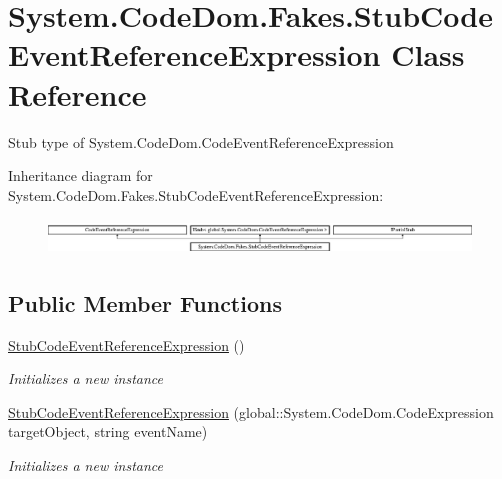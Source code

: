 \hypertarget{class_system_1_1_code_dom_1_1_fakes_1_1_stub_code_event_reference_expression}{\section{System.\-Code\-Dom.\-Fakes.\-Stub\-Code\-Event\-Reference\-Expression Class Reference}
\label{class_system_1_1_code_dom_1_1_fakes_1_1_stub_code_event_reference_expression}
}


Stub type of System.\-Code\-Dom.\-Code\-Event\-Reference\-Expression 


Inheritance diagram for System.\-Code\-Dom.\-Fakes.\-Stub\-Code\-Event\-Reference\-Expression\-:\begin{figure}[H]
\begin{center}
\leavevmode
\includegraphics[height=0.942761cm]{class_system_1_1_code_dom_1_1_fakes_1_1_stub_code_event_reference_expression}
\end{center}
\end{figure}
\subsection*{Public Member Functions}
\begin{DoxyCompactItemize}
\item 
\hyperlink{class_system_1_1_code_dom_1_1_fakes_1_1_stub_code_event_reference_expression_ae121a4548a83c8eb2e98e6e23a9341bb}{Stub\-Code\-Event\-Reference\-Expression} ()
\begin{DoxyCompactList}\small\item\em Initializes a new instance\end{DoxyCompactList}\item 
\hyperlink{class_system_1_1_code_dom_1_1_fakes_1_1_stub_code_event_reference_expression_a1988f9bb3d9c5cc2bd75a7e3820c51f3}{Stub\-Code\-Event\-Reference\-Expression} (global\-::\-System.\-Code\-Dom.\-Code\-Expression target\-Object, string event\-Name)
\begin{DoxyCompactList}\small\item\em Initializes a new instance\end{DoxyCompactList}\end{DoxyCompactItemize}
